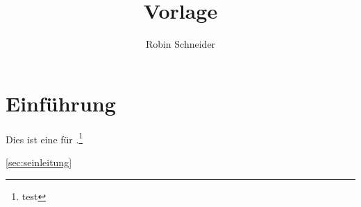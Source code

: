 \documentclass[
  ngerman,
]{scrartcl}
\title{Vorlage}
\author[*]{Robin Schneider}
\affil[*]{%
  \href{mailto:ypid@riseup.net}{ypid@riseup.net}\\
  {%
    \small%
    EDE1 371D 1B87 D28D A5E8 0515 86FD 980B \textit{BF1A 40F8}
  }
}
\begin{document}
\maketitle
\newpage
\tableofcontents%


\mainmatter%
\section{Einführung}
\label{sec:einleitung}
Dies ist eine \MyTitle{} für \SUBJECT{}.\footnote{test}

\ref{sec:seinleitung}


\textdiscount

\appendix

\vfill
\printURLlong%
\doclicenseThis%
\printVersionNote%
\printendsignature%
\end{document}
